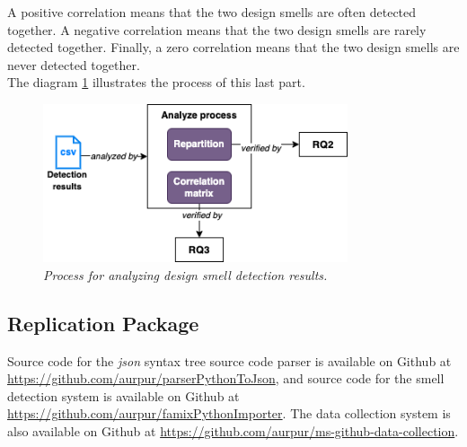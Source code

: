 A positive correlation means that the two design smells are often detected together. A negative correlation means that the two design smells are rarely detected together. Finally, a zero correlation means that the two design smells are never detected together.\\

The diagram \ref{fig:analysis} illustrates the process of this last part.\\

\begin{figure}[h!]
  \centering
  \includegraphics[width=0.8\textwidth]{figure/design_smell_analyze.png}
  \caption{\emph{Process for analyzing design smell detection results.}}
  \label{fig:analysis}
\end{figure}

\subsection{Replication Package}
\label{sec:Replication Package}
Source code for the \emph{json} syntax tree source code parser is available on Github at \url{https://github.com/aurpur/parserPythonToJson}, and source code for the smell detection system is available on Github at \url{https://github.com/aurpur/famixPythonImporter}. The data collection system is also available on Github at \url{https://github.com/aurpur/ms-github-data-collection}.\\
